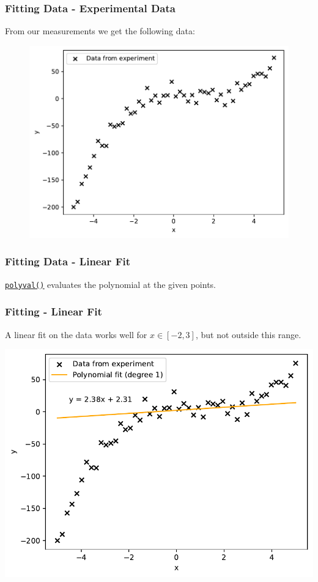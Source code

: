 \documentclass{beamer}
\newcommand{\hrefu}[2]{\underline{\href{#1}{#2}}}
\begin{document}
\begin{frame}
  \frametitle{Fitting Data - Experimental Data}
  From our measurements we get the following data:
  \begin{figure}[H]
    \centering
    \begin{samepage}
        \includegraphics[width=0.65\linewidth]{fig/fitting1.pdf}
    \end{samepage}
\end{figure}
\end{frame}

\begin{frame}
  \frametitle{Fitting Data - Linear Fit}
  
  \hrefu{https://numpy.org/doc/stable/reference/generated/numpy.polyval.html}{\texttt{polyval()}} evaluates the polynomial at the given points.
\end{frame}

\begin{frame}
  \frametitle{Fitting - Linear Fit}
  \begin{minipage}[t]{0.25\textwidth}
    \vspace{-5.0cm}
    A linear fit on the data works well for $x \in [-2,3]$, but not outside this range.
\end{minipage}
\hfill
\begin{minipage}[t]{0.72\textwidth}
    \centering
    \includegraphics[width=\linewidth]{fig/fitting2.pdf}
\end{minipage}
\end{frame}
\end{document}
